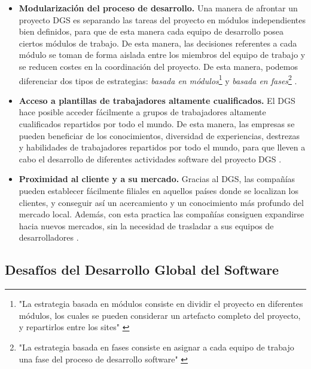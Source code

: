 \begin{itemize}
	\item \textbf{Modularización del proceso de desarrollo.} Una manera de afrontar un proyecto DGS es separando las tareas del proyecto en módulos independientes bien definidos, para que de esta manera cada equipo de desarrollo posea ciertos módulos de trabajo. De esta manera, las decisiones referentes a cada módulo se toman de forma aislada entre los miembros del equipo de trabajo y se reducen costes en la coordinación del proyecto. De esta manera, podemos diferenciar dos tipos de estrategias: \emph{basada en módulos}\footnote{"La estrategia basada en módulos consiste en dividir el proyecto en diferentes módulos, los cuales se pueden considerar un artefacto completo del proyecto, y repartirlos entre los sites" \cite{piattini2014desarrollo}} y \emph{basada en fases}\footnote{"La estrategia basada en fases consiste en asignar a cada equipo de trabajo una fase del proceso de desarrollo software" \cite{piattini2014desarrollo}} \cite{conchuir2006exploring, conchuir2009global, aagerfalk2008benefits}.
	
	\item \textbf{Acceso a plantillas de trabajadores altamente cualificados.} El DGS hace posible acceder fácilmente a grupos de trabajadores altamente cualificados repartidos por todo el mundo. De esta manera, las empresas se pueden beneficiar de los conocimientos, diversidad de experiencias, destrezas y habilidades de trabajadores repartidos por todo el mundo, para que lleven a cabo el desarrollo de diferentes actividades software del proyecto DGS \cite{vizcaino2015vision, conchuir2006exploring, conchuir2009global, aagerfalk2008benefits}.
	
	\item \textbf{Proximidad al cliente y a su mercado.} Gracias al DGS, las compañías pueden establecer fácilmente filiales en aquellos países donde se localizan los clientes, y conseguir así un acercamiento y un conocimiento más profundo del mercado local. Además, con esta practica las compañías consiguen expandirse hacia nuevos mercados, sin la necesidad de trasladar a sus equipos de desarrolladores \cite{vizcaino2015vision, conchuir2006exploring, conchuir2009global, aagerfalk2008benefits}.
\end{itemize}

\subsection{Desafíos del Desarrollo Global del Software}
\label{sec:Desafios}

